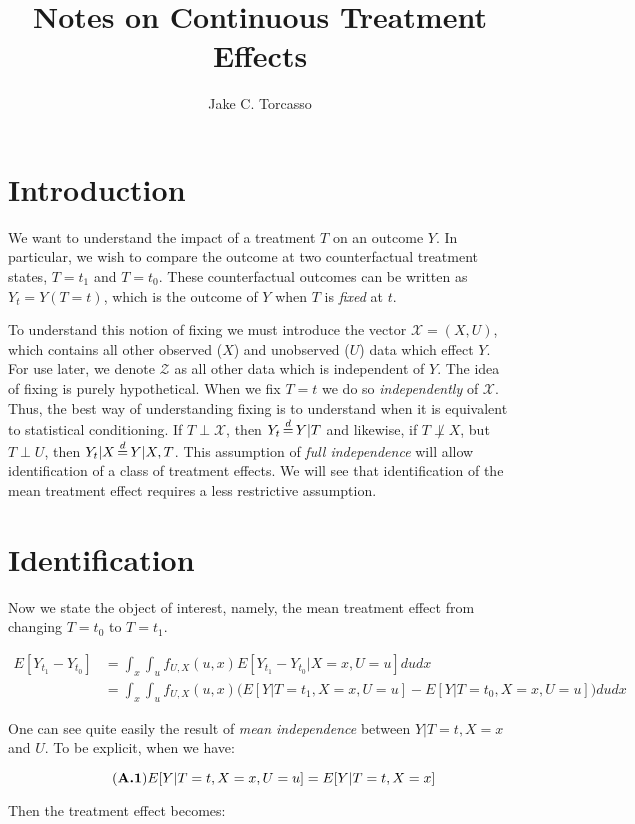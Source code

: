 \documentclass{article}
\title{Notes on Continuous Treatment Effects}
\author{Jake C. Torcasso}
\begin{document}
	
	\section{Introduction}
	We want to understand the impact of a treatment $T$ on an outcome
	$Y$. In particular, we wish to compare the outcome at two counterfactual 
	treatment states, $T=t_1$ and $T=t_0$. These counterfactual outcomes can
	be written as $Y_t = Y(T=t)$, which is the outcome of $Y$ when 
	$T$ is \emph{fixed} at $t$. 

	To understand this notion of fixing we must
	introduce the vector $\mathcal{X}=(X,U)$, which contains all other observed ($X$)
	and unobserved ($U$) data which effect $Y$. 
	For use later, we denote $\mathcal{Z}$ as all other data which is independent of
	$Y$. 
	The idea of fixing is purely hypothetical. 
	When we fix $T=t$ we do so \emph{independently} of $\mathcal{X}$. Thus, the best
	way of understanding fixing is to understand when it is equivalent to
	statistical conditioning. If $T \perp \mathcal{X}$, 
	then $Y_t \,{\buildrel d \over =}\,  Y|T$ and likewise, if $T\not\perp X$, 
	but $T\perp U$, then $Y_t|X \,{\buildrel d \over =}\, Y|X,T$. 
	This assumption of \emph{full independence} will allow identification of a class
	of treatment effects. We will see that identification of the mean treatment
	effect requires a less restrictive assumption.

	\section{Identification}
	Now we state the object of interest, namely, the mean treatment effect from
	changing $T=t_0$ to $T=t_1$.

	\begin{align}
		E[Y_{t_1} - Y_{t_0}] & = \int_x\int_uf_{U,X}(u,x)E[Y_{t_1}-Y_{t_0}|X=x,U=u]dudx \\ \nonumber
		                     & = \int_x\int_uf_{U,X}(u,x)\bigg(E[Y|T=t_1,X=x,U=u]-E[Y|T=t_0,X=x,U=u]\bigg)dudx
	\end{align}

	\noindent One can see quite easily the result of \emph{mean independence} between 
	$Y|T=t,X=x$ and $U$. To be explicit, when we have:

	\begin{equation} \tag{\textbf{A.1}} \label{eq:ass1}
		E[Y|T=t,X=x,U=u] = E[Y|T=t,X=x]
	\end{equation}

	\noindent Then the treatment effect becomes:
\end{document}

